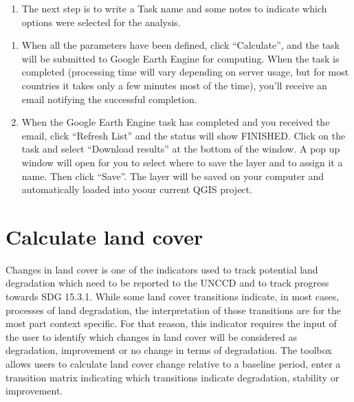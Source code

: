 \documentclass[letterpaper,10pt,english]{sphinxmanual}
\begin{document}
\begin{enumerate}
%
\setcounter{enumi}{2}
\item {} 
\sphinxAtStartPar
The next step is to write a Task name and some notes to indicate which
options were selected for the analysis.

\end{enumerate}

\begin{enumerate}
%
\setcounter{enumi}{3}
\item {} 
\sphinxAtStartPar
When all the parameters have been defined, click “Calculate”, and the task
will be submitted to Google Earth Engine for computing. When the task is
completed (processing time will vary depending on server usage, but for most
countries it takes only a few minutes most of the time), you’ll receive an
email notifying the successful completion.

\item {} 
\sphinxAtStartPar
When the Google Earth Engine task has completed and you received the email,
click “Refresh List” and the status will show FINISHED. Click on the task
and select “Download results” at the bottom of the window. A pop up window
will open for you to select where to save the layer and to assign it a name.
Then click “Save”. The layer will be saved on your computer and
automatically loaded into yoour current QGIS project.

\end{enumerate}



\section{Calculate land cover}
\label{\detokenize{Qgis_Plugin/Calculate_sdg15:calculate-land-cover}}
\sphinxAtStartPar
Changes in land cover is one of the indicators used to track potential land
degradation which need to be reported to the UNCCD and to track progress
towards SDG 15.3.1. While some land cover transitions indicate, in most cases,
processes of land degradation, the interpretation of those transitions are for
the most part context specific. For that reason, this indicator requires the
input of the user to identify which changes in land cover will be considered as
degradation, improvement or no change in terms of degradation. The toolbox
allows users to calculate land cover change relative to a baseline period,
enter a transition matrix indicating which transitions indicate degradation,
stability or improvement.
\end{document}
